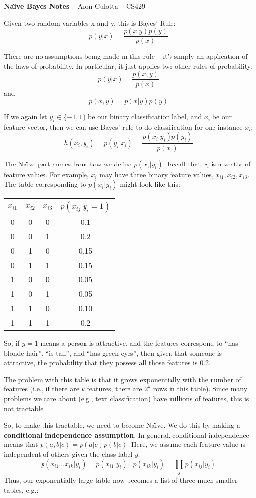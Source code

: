 \documentclass{article}
\begin{document}
\Large{\bf Na\"{\i}ve Bayes Notes}  -- Aron Culotta --  CS429
\normalsize

\vspace{.1in}

Given two random variables x and y, this is Bayes' Rule:
$$
p(y|x) = \frac{p(x|y)p(y)}{p(x)}
$$

There are no assumptions being made in this rule -- it's simply an application of the laws of probability. In particular, it just applies two other rules of probability:
$$
p(y|x) = \frac{p(x,y)}{p(x)}
$$
and
$$
p(x,y) = p(x|y)p(y)
$$

If we again let $y_i\in \{-1,1\}$ be our binary classification label, and $x_i$ be our feature vector, then we can use Bayes' rule to do classification for one instance $x_i$:
$$
h(x_i,y_i) = p(y_i|x_i) = \frac{p(x_i|y_i)p(y_i)}{p(x_i)}
$$

The Na\"{\i}ve part comes from how we define $p(x_i|y_i)$. Recall that $x_i$ is a vector of feature values. For example, $x_i$ may have three binary feature values, $x_{i1}, x_{i2}, x_{i3}$. The table corresponding to $p(x_i|y_i)$ might look like this:

\begin{tabular}{|c|c|c|c|}
\hline
$x_{i1}$ & $x_{i2}$ & $x_{i3}$ & $p(x_{ij}|y_i=1)$\\
\hline
0 & 0 & 0 & 0.1\\
0 & 0 & 1 & 0.2\\
0 & 1 & 0 & 0.15\\
0 & 1 & 1 & 0.15\\
1 & 0 & 0 & 0.05\\
1 & 0 & 1 & 0.05\\
1 & 1 & 0 & 0.10\\
1 & 1 & 1 & 0.2\\
\hline
\end{tabular}

So, if $y=1$ means a person is attractive, and the features correspond to ``has blonde hair'', ``is tall'', and ``has green eyes'', then given that someone is attractive, the probability that they possess all those features is 0.2.

The problem with this table is that it grows exponentially with the
number of features (i.e., if there are $k$ features, there are $2^k$
rows in this table). Since many problems we care about (e.g., text classification) have millions of features, this is not tractable.

So, to make this tractable, we need to become Na\"{\i}ve. We do this by making a {\bf conditional independence assumption}. In general, conditional independence means that $p(a,b|c) = p(a|c)p(b|c)$. Here, we assume each feature value is independent of others given the class label $y$.
$$
p(x_{i1} \ldots x_{ik} | y_i) = p(x_{i1}|y_i)\ldots p(x_{ik}|y_i) = \prod_j p(x_{ij}|y_i)
$$
Thus, our exponentially large table now becomes a list of three much smaller tables, e.g.:
\end{document}
